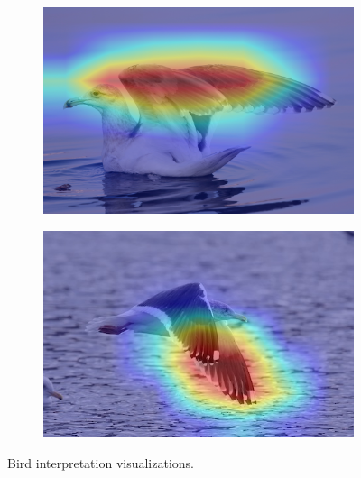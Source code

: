 \documentclass[a4paper,12pt]{report}
\begin{document}
\begin{figure}[htbp]
\begin{subfigure}[b]{0.22\textwidth}
        \caption{}
    \end{subfigure}
    \hfill
    \begin{subfigure}[b]{0.22\textwidth}
        \includegraphics[width=\textwidth]{images/interpretability/vgg/bird8.jpg}
        \caption{}
    \end{subfigure}
    \hfill
    \begin{subfigure}[b]{0.22\textwidth}
        \includegraphics[width=\textwidth]{images/interpretability/vgg/bird9.jpeg}
        \caption{}
    \end{subfigure}
    \caption{Bird interpretation visualizations.}
    \label{fig:bird-interpretability}
\end{figure}

    
\end{document}
